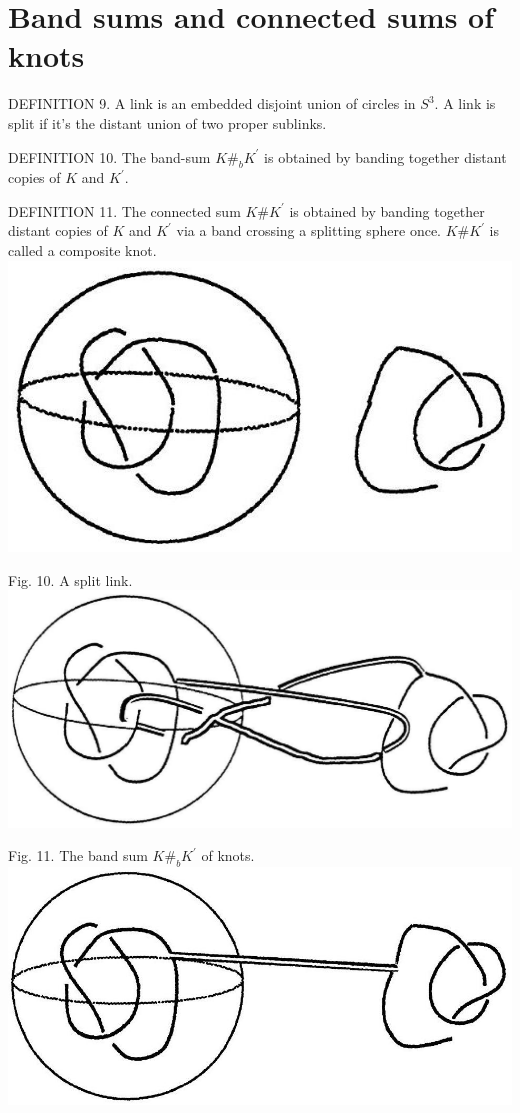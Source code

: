 \documentclass[10pt, letterpaper]{article}
\begin{document}
\section{Band sums and connected sums of knots}

DEFINITION 9. A link is an embedded disjoint union of circles in $S^{3}$. A link is split if it's the distant union of two proper sublinks.

DEFINITION 10. The band-sum $K \#_{b} K^{\prime}$ is obtained by banding together distant copies of $K$ and $K^{\prime}$.

DEFINITION 11. The connected sum $K \# K^{\prime}$ is obtained by banding together distant copies of $K$ and $K^{\prime}$ via a band crossing a splitting sphere once. $K \# K^{\prime}$ is called a composite knot.\\
\includegraphics[scale=0.2, center]{2025_05_21_037de704f595ce642d3eg-083(1)}

Fig. 10. A split link.\\
\includegraphics[scale=0.2, center]{2025_05_21_037de704f595ce642d3eg-083(2)}

Fig. 11. The band sum $K \#_{b} K^{\prime}$ of knots.\\
\includegraphics[scale=0.2, center]{2025_05_21_037de704f595ce642d3eg-083}
\end{document}
